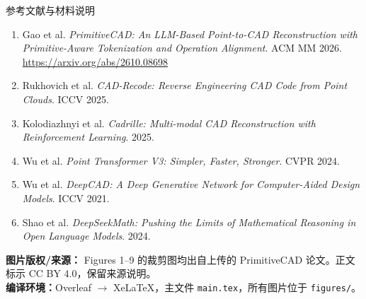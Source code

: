 \documentclass[aspectratio=169,11pt]{beamer}
\begin{document}
\begin{frame}{参考文献与材料说明}
\footnotesize
\begin{enumerate}\setlength{\itemsep}{0.43em}
\item Gao et al. \textit{PrimitiveCAD: An LLM-Based Point-to-CAD Reconstruction with Primitive-Aware Tokenization and Operation Alignment}. ACM MM 2026. \url{https://arxiv.org/abs/2610.08698}
\item Rukhovich et al. \textit{CAD-Recode: Reverse Engineering CAD Code from Point Clouds}. ICCV 2025.
\item Kolodiazhnyi et al. \textit{Cadrille: Multi-modal CAD Reconstruction with Reinforcement Learning}. 2025.
\item Wu et al. \textit{Point Transformer V3: Simpler, Faster, Stronger}. CVPR 2024.
\item Wu et al. \textit{DeepCAD: A Deep Generative Network for Computer-Aided Design Models}. ICCV 2021.
\item Shao et al. \textit{DeepSeekMath: Pushing the Limits of Mathematical Reasoning in Open Language Models}. 2024.
\end{enumerate}
\vspace{0.5em}
\textbf{图片版权/来源：} Figures 1–9 的裁剪图均出自上传的 PrimitiveCAD 论文。正文标示 CC BY 4.0，保留来源说明。\\[0.3em]
\textbf{编译环境：}Overleaf $\rightarrow$ XeLaTeX，主文件 \texttt{main.tex}，所有图片位于 \texttt{figures/}。
\end{frame}
\end{document}
